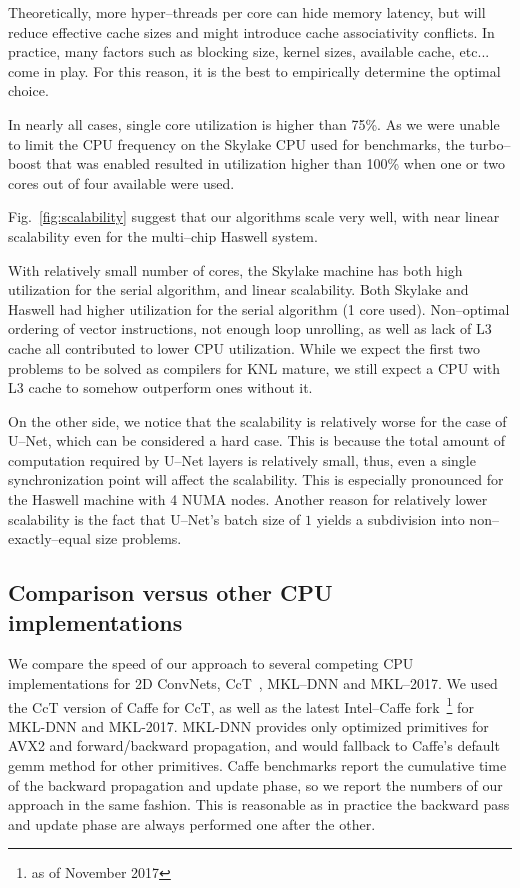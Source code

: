   Theoretically, more hyper--threads per core can hide memory latency,
  but will reduce effective cache sizes and might introduce cache
  associativity conflicts.  In practice, many factors such as blocking
  size, kernel sizes, available cache, etc...  come in play.  For this
  reason, it is the best to empirically determine the optimal choice.

  In nearly all cases, single core utilization is higher than 75\%.
  As we were unable to limit the CPU frequency on the Skylake CPU used
  for benchmarks, the turbo--boost that was enabled resulted in
  utilization higher than 100\% when one or two cores out of four
  available were used.

  Fig.~\ref{fig:scalability} suggest that our algorithms scale very
  well, with near linear scalability even for the multi--chip Haswell
  system.

  With relatively small number of cores, the Skylake machine has both
  high utilization for the serial algorithm, and linear scalability.
  Both Skylake and Haswell had higher utilization for the serial
  algorithm (1 core used).  Non--optimal ordering of vector
  instructions, not enough loop unrolling, as well as lack of L3 cache
  all contributed to lower CPU utilization.  While we expect the first
  two problems to be solved as compilers for KNL mature, we still
  expect a CPU with L3 cache to somehow outperform ones without it.

  On the other side, we notice that the scalability is relatively
  worse for the case of U--Net, which can be considered a hard case.
  This is because the total amount of computation required by U--Net
  layers is relatively small, thus, even a single synchronization
  point will affect the scalability.  This is especially pronounced
  for the Haswell machine with 4 NUMA nodes.  Another reason for
  relatively lower scalability is the fact that U--Net's batch size of
  $1$ yields a subdivision into non--exactly--equal size problems.

  \subsection{Comparison versus other CPU implementations}

  We compare the speed of our approach to several competing CPU
  implementations for 2D ConvNets, CcT~\cite{hadjis2015shallow},
  MKL--DNN and MKL--2017.  We used the CcT version of Caffe for CcT,
  as well as the latest Intel--Caffe fork~\footnote{as of November
    2017} for MKL-DNN and MKL-2017.  MKL-DNN provides only optimized
  primitives for AVX2 and forward/backward propagation, and would
  fallback to Caffe's default gemm method for other primitives.  Caffe
  benchmarks report the cumulative time of the backward propagation
  and update phase, so we report the numbers of our approach in the
  same fashion.  This is reasonable as in practice the backward pass
  and update phase are always performed one after the other.


